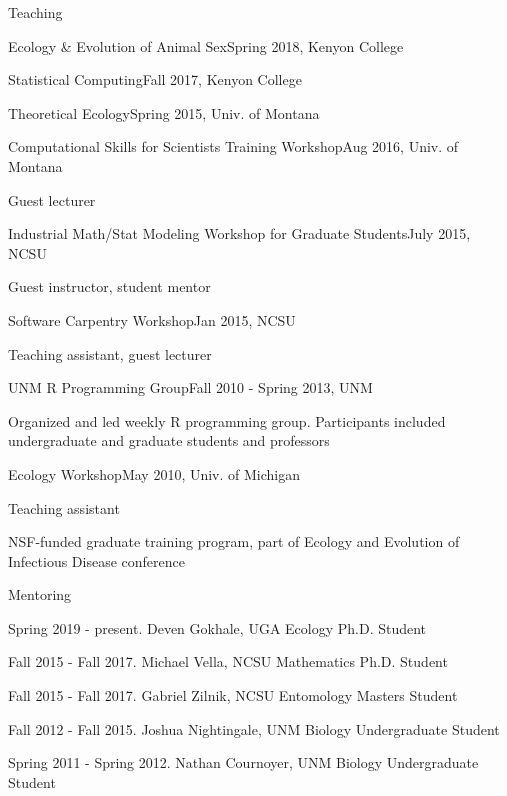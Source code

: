 \documentclass{resume} %
\begin{document}
\begin{rSection}{Teaching}
\begin{rSubsection}{Ecology \& Evolution of Animal Sex}{Spring 2018, Kenyon College}{}{}
\nullitem
\end{rSubsection}
\begin{rSubsection}{Statistical Computing}{Fall 2017, Kenyon College}{}{}
\nullitem
\end{rSubsection}
\begin{rSubsection}{Theoretical Ecology}{Spring 2015, Univ. of Montana}{}{}
\nullitem
\end{rSubsection}
\begin{rSubsection}{Computational Skills for Scientists Training Workshop}{Aug 2016, Univ. of Montana}{}{}
\item Guest lecturer
\end{rSubsection}
\begin{rSubsection}{Industrial Math/Stat Modeling Workshop for Graduate Students}{July 2015, NCSU}{}{}
\item Guest instructor, student mentor
\end{rSubsection}
\begin{rSubsection}{Software Carpentry Workshop}{Jan 2015, NCSU}{}{}
\item Teaching assistant, guest lecturer
\end{rSubsection}
\begin{rSubsection}{UNM R Programming Group}{Fall 2010 - Spring 2013, UNM}{}{}
\item Organized and led weekly R programming group. Participants included undergraduate and graduate students and professors
\end{rSubsection}
\begin{rSubsection}{Ecology Workshop}{May 2010, Univ. of Michigan}{}{}
\item Teaching assistant
\item NSF-funded graduate training program, part of Ecology and Evolution of Infectious
Disease conference
\end{rSubsection}
\end{rSection}

\begin{rSection}{Mentoring}
\item Spring 2019 - present. Deven Gokhale, UGA Ecology Ph.D. Student
\item Fall 2015 - Fall 2017. Michael Vella, NCSU Mathematics Ph.D. Student
\item Fall 2015 - Fall 2017. Gabriel Zilnik, NCSU Entomology Masters Student
\item Fall 2012 - Fall 2015. Joshua Nightingale, UNM Biology Undergraduate Student
\item Spring 2011 - Spring 2012. Nathan Cournoyer, UNM Biology Undergraduate Student
\end{rSection}
\end{document}
